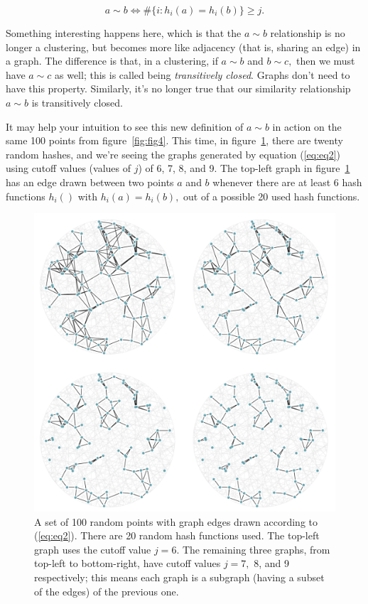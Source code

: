 \documentclass[20pt,]{extarticle}
\newcommand{\smallscrneg}{}
\begin{document}
\begin{equation} a \sim b \iff \#\{i: h_i(a) = h_i(b)\} \ge j. \smallscrneg\label{eq:eq2}\end{equation}

Something interesting happens here, which is that the \(a \sim b\)
relationship is no longer a clustering, but becomes more like adjacency
(that is, sharing an edge) in a graph. The difference is that, in a
clustering, if \(a\sim b\) and \(b\sim c,\) then we must have
\(a\sim c\) as well; this is called being \emph{transitively closed}.
Graphs don't need to have this property. Similarly, it's no longer true
that our similarity relationship \(a\sim b\) is transitively closed.

It may help your intuition to see this new definition of \(a\sim b\) in
action on the same 100 points from figure~\ref{fig:fig4}. This time, in
figure~\ref{fig:fig5}, there are twenty random hashes, and we're seeing
the graphs generated by equation (\ref{eq:eq2}) using cutoff values
(values of \(j\)) of 6, 7, 8, and 9. The top-left graph in
figure~\ref{fig:fig5} has an edge drawn between two points \(a\) and
\(b\) whenever there are at least 6 hash functions \(h_i()\) with
\(h_i(a) = h_i(b),\) out of a possible 20 used hash functions.

\begin{figure}
\centering
\includegraphics{images/lsh_image5.png}
\caption{A set of 100 random points with graph edges drawn according to
(\ref{eq:eq2}). There are 20 random hash functions used. The top-left
graph uses the cutoff value \(j=6.\) The remaining three graphs, from
top-left to bottom-right, have cutoff values \(j=7,\) 8, and 9
respectively; this means each graph is a subgraph (having a subset of
the edges) of the previous one.}\label{fig:fig5}
\end{figure}
\end{document}
